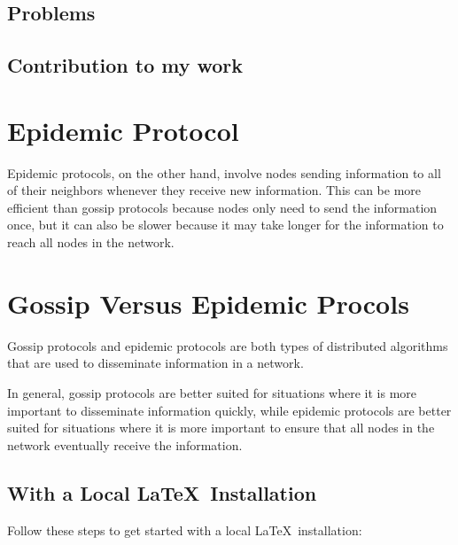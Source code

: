 \subsection{Problems}

\subsection{Contribution to my work}


\section{Epidemic Protocol}
\label{sec:epidemic_protocol}
Epidemic protocols, on the other hand, involve nodes sending information to all of their
neighbors whenever they receive new information. This can be more efficient than gossip
protocols because nodes only need to send the information once, but it can also be slower
because it may take longer for the information to reach all nodes in the network.

\section{Gossip Versus Epidemic Procols}
\label{sec:gossip_vs_epidemic}
Gossip protocols and epidemic protocols are both types of distributed algorithms that are used
to disseminate information in a network.

In general, gossip protocols are better suited for situations where it is more important to
disseminate information quickly, while epidemic protocols are better suited for situations
where it is more important to ensure that all nodes in the network eventually receive the
information.

\subsection{With a Local \LaTeX\ Installation} %
\label{sub:with_a_local_latex_installation}

Follow these steps to get started with a local \LaTeX\ installation:

